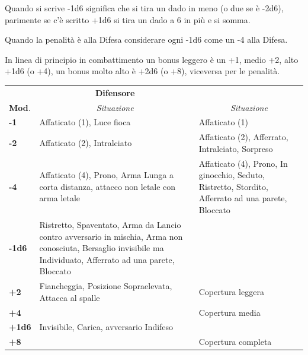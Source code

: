 \begin{multicols}{2}
Quando si scrive -1d6 significa che si tira un dado in meno (o due se è -2d6), parimente se c'è scritto +1d6 si tira un dado a 6 in più e si somma.

Quando la penalità è alla Difesa considerare ogni -1d6 come un -4 alla Difesa.

\medskip

In linea di principio in combattimento un bonus leggero è un +1, medio +2, alto +1d6 (o +4), un bonus molto alto è +2d6 (o +8), viceversa per le penalità.


\medskip

\end{multicols}

\noindent\begin{tabularx}{\linewidth}{l|X|X}
	\toprule
 \rowcolor{gray!20}\multicolumn{2}{c}{\textbf{Attaccante}}&\multicolumn{1}{c}{\textbf{Difensore}}\\
\textbf{Mod}.&\multicolumn{1}{c}{\emph{Situazione}}&\multicolumn{1}{c}{\emph{Situazione}}\\
\toprule
\rowcolor{gray!20}\textbf{-1}& Affaticato (1), Luce fioca&Affaticato (1)\\

\textbf{-2}& Affaticato (2), Intralciato & Affaticato (2), Afferrato, Intralciato, Sorpreso\\

\rowcolor{gray!20}\textbf{-4}& Affaticato (4), Prono, Arma Lunga a corta distanza, attacco non letale con arma letale& Affaticato (4), Prono, In ginocchio, Seduto, Ristretto, Stordito, Afferrato ad una parete, Bloccato\\

\textbf{-1d6}& Ristretto, Spaventato, Arma da Lancio contro avversario in mischia, Arma non conosciuta, Bersaglio invisibile ma Individuato, Afferrato ad una parete, Bloccato&\\

%
\rowcolor{gray!20}\textbf{+2}& Fiancheggia, Posizione Sopraelevata, Attacca al spalle& Copertura leggera\\

\textbf{+4}&& Copertura media\\

\rowcolor{gray!20}\textbf{+1d6}& Invisibile, Carica, avversario Indifeso& \\

\textbf{+8}&& Copertura completa
\end{tabularx}


